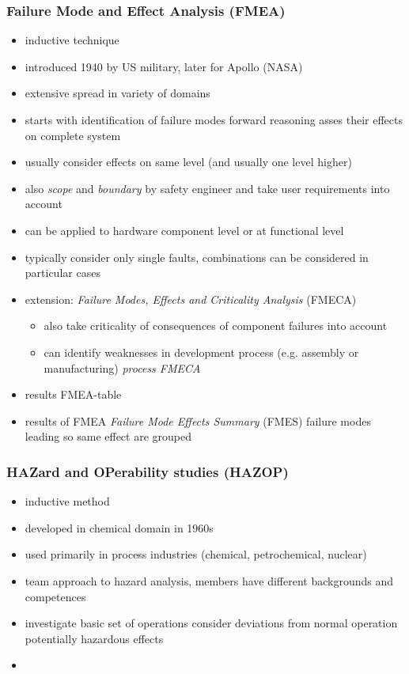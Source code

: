 \documentclass[a4paper, 10pt]{article}
\begin{document}
\subsubsection*{Failure Mode and Effect Analysis (FMEA)}
\begin{itemize}
    \item inductive technique
    \item introduced 1940 by US military, later for Apollo (NASA)
    \item extensive spread in variety of domains
    \item starts with identification of failure modes \follows forward reasoning \follows asses their effects on complete system
    \item usually consider effects on same level (and usually one level higher)
    \item also \emph{scope} and \emph{boundary} \follows by safety engineer and take user requirements into account
    \item can be applied to hardware component level or at functional level
    \item typically consider only single faults, combinations can be considered in particular cases
    \item extension: \emph{Failure Modes, Effects and Criticality Analysis} (FMECA)
    \begin{itemize}
        \item also take criticality of consequences of component failures into account
        \item can identify weaknesses in development process (e.g. assembly or manufacturing) \follows \emph{process FMECA}
    \end{itemize}
    \item results \follows FMEA-table
    \item results of FMEA \follows \emph{Failure Mode Effects Summary} (FMES) \follows failure modes leading so same effect are grouped
\end{itemize}

\subsubsection*{HAZard and OPerability studies (HAZOP)}
\begin{itemize}
    \item inductive method
    \item developed in chemical domain in 1960s
    \item used primarily in process industries (chemical, petrochemical, nuclear)
    \item team approach to hazard analysis, members have different backgrounds and competences
    \item investigate basic set of operations \follows consider deviations from normal operation \follows potentially hazardous effects
    \item
\end{itemize}
\end{document}
